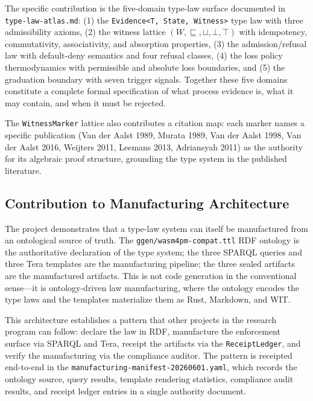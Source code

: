 The specific contribution is the five-domain type-law surface documented in
\texttt{type-law-atlas.md}: (1) the \texttt{Evidence<T, State, Witness>} type law
with three admissibility axioms, (2) the witness lattice $(W, \sqsubseteq, \sqcup,
\bot, \top)$ with idempotency, commutativity, associativity, and absorption properties,
(3) the admission/refusal law with default-deny semantics and four refusal classes,
(4) the loss policy thermodynamics with permissible and absolute loss boundaries,
and (5) the graduation boundary with seven trigger signals. Together these five domains
constitute a complete formal specification of what process evidence is, what it may
contain, and when it must be rejected.

The \texttt{WitnessMarker} lattice also contributes a citation map: each marker
names a specific publication (Van der Aalst 1989, Murata 1989, Van der Aalst 1998,
Van der Aalst 2016, Weijters 2011, Leemans 2013, Adriansyah 2011) as the authority
for its algebraic proof structure, grounding the type system in the published literature.

\subsection{Contribution to Manufacturing Architecture}
\label{sec:sources-wasm4pm-compat-contribution-manufacturing}

The project demonstrates that a type-law system can itself be manufactured from an
ontological source of truth. The \texttt{ggen/wasm4pm-compat.ttl} RDF ontology is the
authoritative declaration of the type system; the three SPARQL queries and three Tera
templates are the manufacturing pipeline; the three sealed artifacts are the manufactured
artifacts. This is not code generation in the conventional sense---it is ontology-driven
law manufacturing, where the ontology encodes the type laws and the templates materialize
them as Rust, Markdown, and WIT.

This architecture establishes a pattern that other projects in the research program can
follow: declare the law in RDF, manufacture the enforcement surface via SPARQL and Tera,
receipt the artifacts via the \texttt{ReceiptLedger}, and verify the manufacturing via
the compliance auditor. The pattern is receipted end-to-end in the
\texttt{manufacturing-manifest-20260601.yaml}, which records the ontology source, query
results, template rendering statistics, compliance audit results, and receipt ledger
entries in a single authority document.

